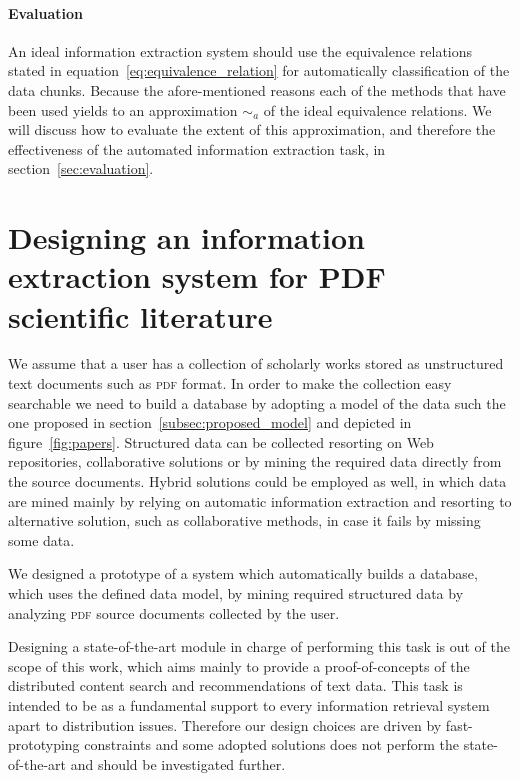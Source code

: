 \paragraph{Evaluation}An ideal information extraction system should use the equivalence relations stated in equation~\ref{eq:equivalence_relation} for automatically classification of the data chunks. Because the afore-mentioned reasons each of the methods that have been used yields to an approximation $\sim_a$ of the ideal equivalence relations. We will discuss how to evaluate the extent of this approximation, and therefore the effectiveness of the automated information extraction task, in section~\ref{sec:evaluation}.


\section[Information extraction from scientific literature in \textsc{pdf}]{\label{sec:design}Designing an information extraction system for PDF scientific literature}
We assume that a user has a collection of scholarly works stored as unstructured text documents such as \textsc{pdf} format. In order to make the collection easy searchable we need to build a database by adopting a model of the data such the one proposed in section~\ref{subsec:proposed_model} and depicted in figure~\ref{fig:papers}. Structured data can be collected resorting on Web repositories, collaborative solutions or by mining the required data directly from the source documents. Hybrid solutions could be employed as well, in which data are mined mainly by relying on automatic information extraction and resorting to alternative solution, such as collaborative methods, in case it fails by missing some data.

We designed a prototype of a system which automatically builds a database, which uses the defined data model, by mining required structured data by analyzing \textsc{pdf} source documents collected by the user.

Designing a state-of-the-art module in charge of performing this task is out of the scope of this work, which aims mainly to provide a proof-of-concepts of the distributed content search and recommendations of text data. This task is intended to be as a fundamental support to every information retrieval system apart to distribution issues. Therefore our design choices are driven by fast-prototyping constraints and some adopted solutions does not perform the state-of-the-art and should be investigated further.

